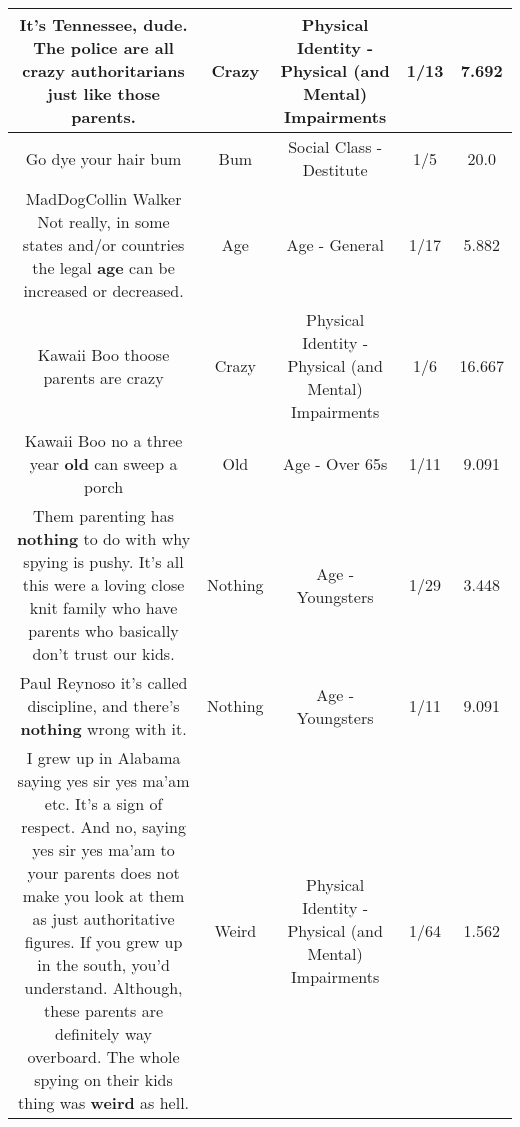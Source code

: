 \documentclass[11pt]{article}
\newlength\mylength
\begin{document}
\begin{center}
\begin{longtable}{|C{.65\mylength}|C{.30\mylength}|C{.12\mylength}|C{.12\mylength}|C{.12\mylength}|}
  \small It's Tennessee, dude. The police are all \textbf{crazy} authoritarians just like those parents.\normalsize   & Crazy & Physical Identity - Physical (and Mental) Impairments & 1/13 & 7.692 \\  \hline
  \small Go dye your hair bum\normalsize   & Bum & Social Class - Destitute & 1/5 & 20.0 \\  \hline
  \small MadDogCollin Walker Not really, in some states and/or countries the legal \textbf{age} can be increased or decreased.\normalsize   & Age & Age - General & 1/17 & 5.882 \\  \hline
  \small Kawaii Boo thoose parents are crazy\normalsize   & Crazy & Physical Identity - Physical (and Mental) Impairments & 1/6 & 16.667 \\  \hline
  \small Kawaii Boo no a three year \textbf{old} can sweep a porch\normalsize   & Old & Age - Over 65s & 1/11 & 9.091 \\  \hline
  \small Them parenting has \textbf{nothing} to do with why spying is pushy. It's all this were a loving close knit family who have parents who basically don't trust our kids.\normalsize   & Nothing & Age - Youngsters & 1/29 & 3.448 \\  \hline
  \small Paul Reynoso it's called discipline, and there's \textbf{nothing} wrong with it.\normalsize   & Nothing & Age - Youngsters & 1/11 & 9.091 \\  \hline
  \small I grew up in Alabama saying yes sir yes ma'am etc. It's a sign of respect. And no, saying yes sir yes ma'am to your parents does not make you look at them as just authoritative figures. If you grew up in the south, you'd understand. Although, these parents are definitely way overboard. The whole spying on their kids thing was \textbf{weird} as hell.\normalsize   & Weird & Physical Identity - Physical (and Mental) Impairments & 1/64 & 1.562 \\  \hline

\end{longtable}
\end{center}
\end{document}
